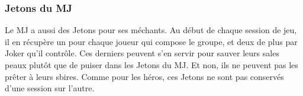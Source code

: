 \newpage
\subsubsection{Jetons du MJ}
Le MJ a aussi des Jetons pour ses méchants. Au début de chaque session de jeu, il en récupère un pour chaque joueur qui compose le groupe, et deux de plus par Joker qu’il contrôle. Ces derniers peuvent s’en servir pour sauver leurs sales peaux plutôt que de puiser dans les Jetons du MJ. Et non, ils ne peuvent pas les prêter à leurs sbires. Comme pour les héros, ces Jetons ne sont pas conservés d’une session sur l’autre.

